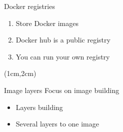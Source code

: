 \begin{frame}[<+->]{Docker registries}
\begin{enumerate}
\item Store Docker images
\item Docker hub is a public registry
\item You can run your own registry
\end{enumerate}
\begin{textblock*}{10cm}(1cm,2cm)
\end{textblock*}
\end{frame}

\begin{frame}[fragile]{Image layers}
Focus on image building
\begin{itemize}[<+->]
\item Layers building
\item Several layers to one image
\end{itemize}
\end{frame}


